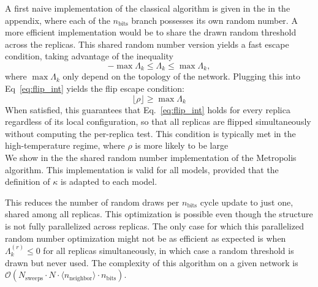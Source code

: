 A first naive implementation of the classical algorithm is given in the  in the appendix, where each of the $n_\text{bits}$ branch possesses its own random number. A more efficient implementation would be to share the drawn random threshold across the replicas. This shared random number version yields a fast escape condition, taking advantage of the inequality
\begin{equation*}
 -\max\Lambda_k \leq \Lambda_k \leq \max\Lambda_k ,
\end{equation*}
where $\max\Lambda_k $ only depend on the topology of the network.
Plugging this into Eq~\eqref{eq:flip_int} yields the flip escape condition:
\begin{equation}
 \lfloor \rho \rfloor \geq \max\Lambda_k
 \label{eq:flip_escape_condition}
\end{equation}
When satisfied, this guarantees that Eq.~\eqref{eq:flip_int} holds for every replica regardless of its local configuration, so that all replicas are flipped simultaneously without computing the per-replica test. This condition is typically met in the high-temperature regime, where $\rho$ is more likely to be large\\
We show in the  the shared random number implementation of the Metropolis algorithm. This implementation is valid for all models, provided that the definition of $\kappa$ is adapted to each model.\\
\vspace{1em}
\begin{algorithm}[b]
\DontPrintSemicolon
\caption{Standard Metropolis implementation}
\BlankLine
\BlankLine
{}
\label{alg:ising_classic}
\end{algorithm}
\vspace{1em}
This reduces the number of random draws per $n_\text{bits}$ cycle update to just one, shared among all replicas. This optimization is possible even though the structure is not fully parallelized across replicas. The only case for which this parallelized random number optimization might not be as efficient as expected is when $\Lambda_k^{(r)} \leq 0$  for all replicas simultaneously, in which case a random threshold is drawn but never used.
The complexity of this algorithm on a given network is $\mathcal{O}\left(N_\text{sweeps}\cdot N \cdot \langle n_\text{neighbor} \rangle \cdot n_\text{bits} \right)$.
